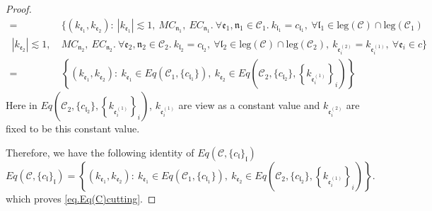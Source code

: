 \begin{proof}
\begin{equation}
\begin{split}
 =&\{(k_{\mathfrak{e}_1},k_{\mathfrak{e}_2}):\ |k_{\mathfrak{e}_1}| \lesssim 1,\ MC_{\mathfrak{n}_1},\  EC_{\mathfrak{n}_1}.\ \forall \mathfrak{e}_1, \mathfrak{n}_1\in\mathcal{C}_1.\ k_{\mathfrak{l}_1}=c_{\mathfrak{l}_1},\ \forall \mathfrak{l}_1\in \text{leg}(\mathcal{C})\cap \text{leg}(\mathcal{C}_1)
 \\
 \ |k_{\mathfrak{e}_2}| \lesssim 1,\ &MC_{\mathfrak{n}_2},\  EC_{\mathfrak{n}_2}.\ \forall \mathfrak{e}_2, \mathfrak{n}_2\in\mathcal{C}_2.\ k_{\mathfrak{l}_2}=c_{\mathfrak{l}_2},\ \forall \mathfrak{l}_2\in \text{leg}(\mathcal{C})\cap \text{leg}(\mathcal{C}_2),\ k_{\mathfrak{e}_{i}^{(2)}}=k_{\mathfrak{e}_{i}^{(1)}},\ \forall\mathfrak{e}_{i}\in c\}
 \\
 =&\left\{(k_{\mathfrak{e}_1},k_{\mathfrak{e}_{2}}):\ k_{\mathfrak{e}_1}\in Eq(\mathcal{C}_1,\{c_{\mathfrak{l}_1}\}),\  k_{\mathfrak{e}_{2}}\in Eq\left(\mathcal{C}_{2}, \{c_{\mathfrak{l}_2}\}, \left\{k_{\mathfrak{e}_{i}^{(1)}}\right\}_{i}\right)\right\}
 \end{split}
\end{equation}
Here in $Eq\left(\mathcal{C}_{2}, \{c_{\mathfrak{l}_2}\}, \left\{k_{\mathfrak{e}_{i}^{(1)}}\right\}_{i}\right)$, $k_{\mathfrak{e}_{i}^{(1)}}$ are view as a constant value and $k_{\mathfrak{e}_{i}^{(2)}}$ are fixed to be this constant value.

Therefore, we have the following identity of $Eq(\mathcal{C},\{c_{\mathfrak{l}}\}_{\mathfrak{l}})$
\begin{equation}
 Eq(\mathcal{C},\{c_{\mathfrak{l}}\}_{\mathfrak{l}})=\left\{(k_{\mathfrak{e}_1},k_{\mathfrak{e}_{2}}):\ k_{\mathfrak{e}_1}\in Eq(\mathcal{C}_1,\{c_{\mathfrak{l}_1}\}),\  k_{\mathfrak{e}_{2}}\in Eq\left(\mathcal{C}_{2}, \{c_{\mathfrak{l}_2}\}, \left\{k_{\mathfrak{e}_{i}^{(1)}}\right\}_{i}\right)\right\}.
\end{equation}
which proves \eqref{eq.Eq(C)cutting}.


\end{proof}
